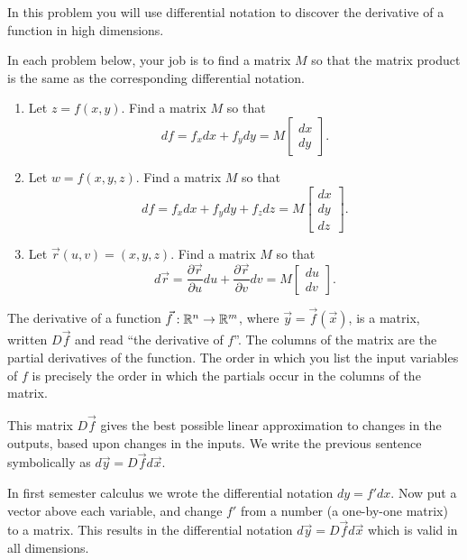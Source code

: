 In this problem you will use differential notation to discover the derivative of a function in high dimensions.
\begin{problem}%
In each problem below, your job is to find a matrix $M$ so that the matrix product is the same as the corresponding differential notation. 
\begin{enumerate}
 \item  Let $z=f(x,y)$. Find a matrix $M$ so that 
$$df=f_xdx+f_ydy=M\begin{bmatrix}dx\\dy\end{bmatrix}.$$
 \item  Let $w=f(x,y,z)$. Find a matrix $M$ so that 
$$df=f_xdx+f_ydy+f_zdz=M\begin{bmatrix}dx\\dy\\dz\end{bmatrix}.$$
 \item  Let $\vec r(u,v)=(x,y,z)$. Find a matrix $M$ so that 
$$d\vec r=\frac{\partial \vec r}{\partial u}du+\frac{\partial \vec r}{\partial v}dv=M\begin{bmatrix}du\\dv\end{bmatrix}.$$
\end{enumerate}
\end{problem}

\begin{definition}
The derivative of a function $\vec f:\mathbb{R}^n\to \mathbb{R}^m$, where $\vec y=\vec f(\vec x)$, is a matrix, written $D\vec f$ and read ``the derivative of $f$''. The columns of the matrix are the partial derivatives of the function. The order in which you list the input variables of $f$ is precisely the order in which the partials occur in the columns of the matrix.

 This matrix $D\vec f$ gives the best possible linear approximation to changes in the outputs, based upon changes in the inputs. We write the previous sentence symbolically as $d\vec y = D\vec f d\vec x$. 
\end{definition}
In first semester calculus we wrote the differential notation $dy=f'dx$.  Now put a vector above each variable, and change $f'$ from a number (a one-by-one matrix) to a matrix. This results in the differential notation $d\vec y = D\vec f d\vec x$ which is valid in all dimensions. 

